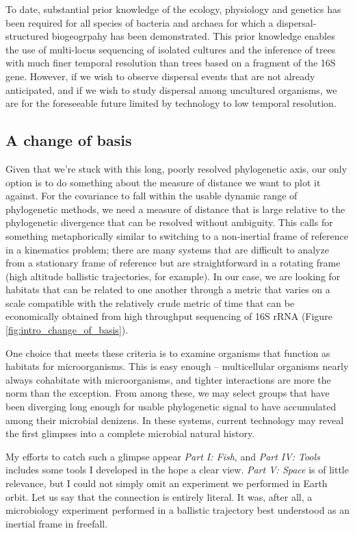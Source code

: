 To date, substantial prior knowledge of the ecology, physiology and genetics has been required for all species of bacteria and archaea for which a dispersal-structured biogeogrpahy has been demonstrated. This prior knowledge enables the use of multi-locus sequencing of isolated cultures and the inference of trees with much finer temporal resolution than trees based on a fragment of the 16S gene. However, if we wish to observe dispersal events that are not already anticipated, and if we wish to study dispersal among uncultured organisms, we are for the foreseeable future limited by technology to low temporal resolution.

\subsection*{A change of basis}

Given that we're stuck with this long, poorly resolved phylogenetic axis, our only option is to do something about the measure of distance we want to plot it against. For the covariance to fall within the usable dynamic range of phylogenetic methods, we need a measure of distance that is large relative to the phylogenetic divergence that can be resolved without ambiguity. This calls for something metaphorically similar to switching to a non-inertial frame of reference in a kinematics problem; there are many systems that are difficult to analyze from a stationary frame of reference but are straightforward in a rotating frame (high altitude ballistic trajectories, for example). In our case, we are looking for habitats that can be related to one another through a metric that varies on a scale compatible with the relatively crude metric of time that can be economically obtained from high throughput sequencing of 16S rRNA (Figure \ref{fig:intro_change_of_basis}).



One choice that meets these criteria is to examine organisms that function as habitats for microorganisms. This is easy enough -- multicellular organisms nearly always cohabitate with microorganisms, and tighter interactions are more the norm than the exception. From among these, we may select groups that have been diverging long enough for usable phylogenetic signal to have accumulated among their microbial denizens. In these systems, current technology may reveal the first glimpses into a complete microbial natural history.

My efforts to catch such a glimpse appear {\em Part I: Fish}, and {\em Part IV: Tools} includes some tools I developed in the hope a clear view. {\em Part V: Space} is of little relevance, but I could not simply omit an experiment we performed in Earth orbit. Let us say that the connection is entirely literal. It was, after all, a microbiology experiment performed in a ballistic trajectory best understood as an inertial frame in freefall.